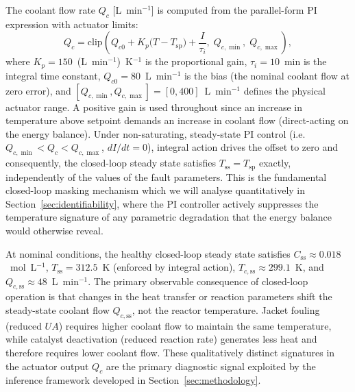 \documentclass[aps,pre,twocolumn,superscriptaddress,floatfix]{revtex4-2}
\begin{document}
The coolant flow rate $Q_c$ [L~min$^{-1}$] is computed from the
parallel-form PI expression with actuator limits:
%
\begin{equation}
  Q_c = \mathrm{clip}\!\left(
    Q_{c0} + K_p\bigl(T - T_\mathrm{sp}\bigr) + \frac{I}{\tau_i},\;
    Q_{c,\min},\;
    Q_{c,\max}
  \right),
  \label{eq:pi_law}
\end{equation}
%
where $K_p = 150$~(L~min$^{-1}$)~K$^{-1}$ is the proportional gain,
$\tau_i = 10$~min is the integral time constant, $Q_{c0} = 80$~L~min$^{-1}$
is the bias (the nominal coolant flow at zero error), and
$[Q_{c,\min}, Q_{c,\max}] = [0, 400]$~L~min$^{-1}$ defines the physical
actuator range.  A positive gain is used throughout since an increase in
temperature above setpoint demands an increase in coolant flow
(direct-acting on the energy balance).
Under non-saturating, steady-state PI control
(i.e.\ $Q_{c,\min} < Q_c < Q_{c,\max}$, $dI/dt = 0$), integral action
drives the offset to zero and consequently, the closed-loop steady state satisfies
$T_\mathrm{ss} = T_\mathrm{sp}$ exactly, independently of the values of
the fault parameters.
This is the fundamental closed-loop masking mechanism which we will analyse quantitatively in
Section~\ref{sec:identifiability}, where the PI controller actively suppresses
the temperature signature of any parametric degradation that the energy
balance would otherwise reveal.

At nominal conditions, the healthy closed-loop steady state satisfies
$C_\mathrm{ss} \approx 0.018$~mol~L$^{-1}$,
$T_\mathrm{ss} = 312.5$~K (enforced by integral action),
$T_{c,\mathrm{ss}} \approx 299.1$~K, and
$Q_{c,\mathrm{ss}} \approx 48$~L~min$^{-1}$.
The primary observable consequence of closed-loop operation is that changes
in the heat transfer or reaction parameters shift the steady-state
coolant flow $Q_{c,\mathrm{ss}}$, not the reactor temperature. Jacket
fouling (reduced $U\!A$) requires higher coolant flow to maintain the
same temperature, while catalyst deactivation (reduced reaction rate)
generates less heat and therefore requires lower coolant flow. These
qualitatively distinct signatures in the actuator output $Q_c$ are the
primary diagnostic signal exploited by the inference framework developed
in Section~\ref{sec:methodology}.
\end{document}
